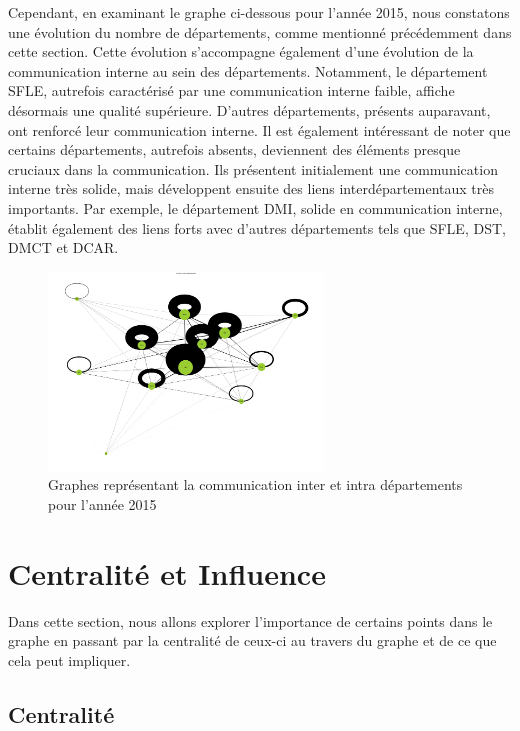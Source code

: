 \documentclass{article}
\begin{document}
Cependant, en examinant le graphe ci-dessous pour l'année 2015, nous constatons une évolution du nombre de départements, comme mentionné précédemment dans cette section. Cette évolution s'accompagne également d'une évolution de la communication interne au sein des départements. Notamment, le département SFLE, autrefois caractérisé par une communication interne faible, affiche désormais une qualité supérieure. D'autres départements, présents auparavant, ont renforcé leur communication interne. Il est également intéressant de noter que certains départements, autrefois absents, deviennent des éléments presque cruciaux dans la communication. Ils présentent initialement une communication interne très solide, mais développent ensuite des liens interdépartementaux très importants. Par exemple, le département DMI, solide en communication interne, établit également des liens forts avec d'autres départements tels que SFLE, DST, DMCT et DCAR.

\begin{figure}[!h]
    \centering
    \includegraphics[width=0.65\textwidth]{assets/communaute/communaute_communication_2015.png}
    \caption{Graphes représentant la communication inter et intra départements pour l'année 2015}
    \label{fig:communaute_communication_2015}
\end{figure}

\section{Centralité et Influence}

Dans cette section, nous allons explorer l’importance de certains points dans le graphe en passant par la centralité de ceux-ci au travers du graphe et de ce que cela peut impliquer.

\subsection{Centralité}
\end{document}
